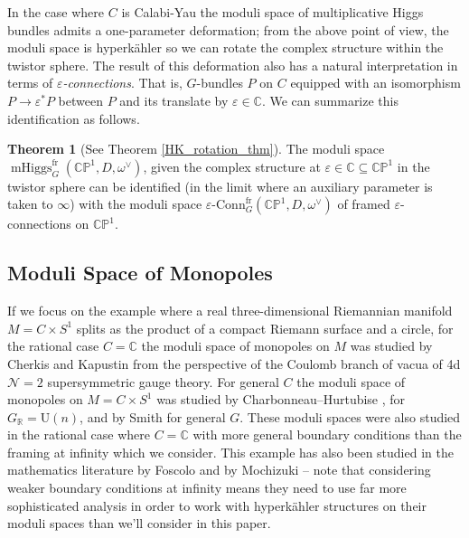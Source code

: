 \documentclass[11pt, oneside, reqno]{amsart}
\theoremstyle{definition} \newtheorem{definition}{Definition}[section]
\newtheorem{theorem}[definition]{Theorem}
\theoremstyle{definition} \newtheorem{remark}[definition]{Remark}
\theoremstyle{definition} \newtheorem{remarks}[definition]{Remarks}
\theoremstyle{definition} \newtheorem{question}[definition]{Question}
\theoremstyle{definition} \newtheorem*{note}{Note}
\theoremstyle{definition} \newtheorem{example}[definition]{Example}
\theoremstyle{definition} \newtheorem{examples}[definition]{Examples}
\newcommand{\bb}[1]{\mathbb{#1}}
\newcommand{\mr}[1]{\mathrm{#1}}
\newcommand{\CC}{\mathbb{C}}
\newcommand{\RR}{\mathbb{R}}
\newcommand{\eps}{\varepsilon}
\newcommand{\sub}{\subseteq}
\DeclareMathOperator{\mhiggs}{mHiggs}
\newcommand{\epsconn}{\varepsilon\text{-Conn}}
\begin{document}
 In the case where $C$ is Calabi-Yau the moduli space of multiplicative Higgs bundles admits a one-parameter deformation; from the above point of view, the moduli space is hyperk\"ahler so we can rotate the complex structure within the twistor sphere.  The result of this deformation also has a natural interpretation in terms of \emph{$\eps$-connections}.  That is, $G$-bundles $P$ on $C$ equipped with an isomorphism $P \to \eps^*P$ between $P$ and its translate by $\eps \in \CC$.  We can summarize this identification as follows.
 
 \begin{theorem} [See Theorem \ref{HK_rotation_thm}]
 The moduli space $\mhiggs^{\text{fr}}_G(\bb{CP}^1,D,\omega^\vee)$, given the complex structure at $\eps \in \CC \sub \bb{CP}^1$ in the twistor sphere can be identified (in the limit where an auxiliary parameter is taken to $\infty$) with the moduli space $\epsconn^{\text{fr}}_G(\bb{CP}^1,D,\omega^\vee)$ of framed $\eps$-connections on $\bb{CP}^1$.
 \end{theorem}

\subsection{Moduli Space of Monopoles}

If we focus on the example where a real three-dimensional Riemannian
manifold $M = C \times S^1$ splits as the product of a compact Riemann
surface and a circle, for the rational case $C = \CC$ the moduli space
of monopoles on $M$ was studied by Cherkis and Kapustin
\cite{CherkisKapustin1,CherkisKapustin2,CherkisKapustin3} from the
perspective of the Coulomb branch of vacua of 4d $\mathcal{N}=2$
supersymmetric gauge theory. For general $C$ the moduli space of
monopoles on $M = C \times S^{1}$ was studied by
Charbonneau--Hurtubise \cite{CharbonneauHurtubise}, for
$G_\RR = \mr U(n)$, and by Smith \cite{Smith} for general $G$.  These
moduli spaces were also studied in the rational case where $C = \CC$
with more general boundary conditions than the framing at infinity
which we consider.  This example has also been studied in the
mathematics literature by Foscolo \cite{FoscoloDef, FoscoloThesis} and
by Mochizuki \cite{Mochizuki} -- note that considering weaker boundary
conditions at infinity means they need to use far more sophisticated
analysis in order to work with hyperk\"ahler structures on their
moduli spaces than we'll consider in this paper.
\end{document}
